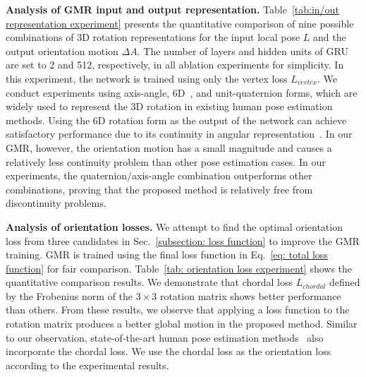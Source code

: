 \documentclass[10pt,twocolumn,letterpaper]{article}
\begin{document}
\textbf{Analysis of GMR input and output representation.} Table~\ref{tab:in/out representation experiment} presents the quantitative comparison of nine possible combinations of 3D rotation representations for the input local pose $L$ and the output orientation motion $\Delta{A}$. The number of layers and hidden units of GRU are set to 2 and 512, respectively, in all ablation experiments for simplicity. In this experiment, the network is trained using only the vertex loss $L_{vertex}$. We conduct experiments using axis-angle, 6D~\cite{zhou2019continuity}, and unit-quaternion forms, which are widely used to represent the 3D rotation in existing human pose estimation methods. Using the 6D rotation form as the output of the network can achieve satisfactory performance due to its continuity in angular representation~\cite{zhou2019continuity}. In our GMR, however, the orientation motion has a small magnitude and causes a relatively less continuity problem than other pose estimation cases. In our experiments, the quaternion/axis-angle combination outperforms other combinations, proving that the proposed method is relatively free from discontinuity problems.



\textbf{Analysis of orientation losses.} We attempt to find the optimal orientation loss from three candidates in Sec.~\ref{subsection: loss function} to improve the GMR training. GMR is trained using the final loss function in Eq.~\ref{eq: total loss function} for fair comparison. Table~\ref{tab: orientation loss experiment} shows the quantitative comparison results. We demonstrate that chordal loss $L_{chordal}$ defined by the Frobenius norm of the $3\times3$ rotation matrix shows better performance than others. From these results, we observe that applying a loss function to the rotation matrix produces a better global motion in the proposed method. Similar to our observation, state-of-the-art human pose estimation methods~\cite{kocabas2020vibe, kolotouros2019learning} also incorporate the chordal loss. We use the chordal loss as the orientation loss according to the experimental results.
\end{document}
